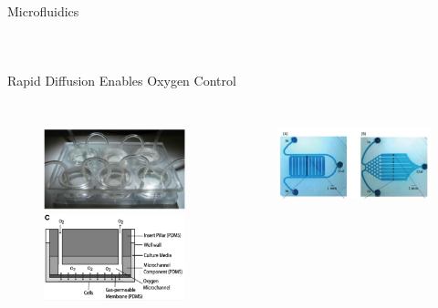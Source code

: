 \documentclass{beamer}
\begin{document}
\begin{frame}{Microfluidics}
\begin{columns}[c]
\begin{figure}
\end{figure}
\end{columns}
\end{frame}

\begin{frame}{Rapid Diffusion Enables Oxygen Control}
\begin{columns}[c] %
\begin{figure}
\includegraphics[width=.8\linewidth]{images/oppegard1.png}\\
\includegraphics[width=.8\linewidth]{images/oppegard2.png}\\
\hspace*{11pt}\hbox{\scriptsize {}}
\end{figure}
\begin{figure}
\includegraphics[width=0.7\linewidth]{images/lo1.png}\\

\end{figure}
\end{columns}
\end{frame}
\end{document}
